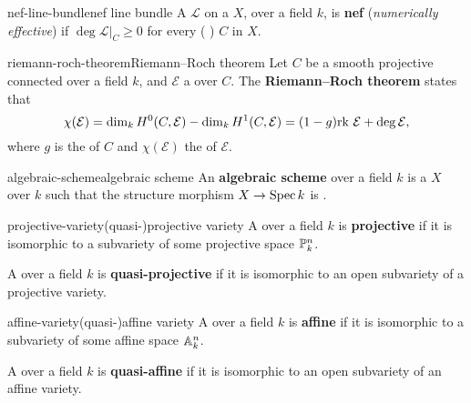 \begin{topic}{nef-line-bundle}{nef line bundle}
    A  $\mathcal{L}$ on a  $X$,  over a field $k$, is \textbf{nef} (\textit{numerically effective}) if $\deg \mathcal{L}|_C \ge 0$ for every ( )  $C$ in $X$.
\end{topic}

\begin{topic}{riemann-roch-theorem}{Riemann--Roch theorem}
    Let $C$ be a smooth projective connected  over a field $k$, and $\mathcal{E}$ a  over $C$. The \textbf{Riemann--Roch theorem} states that
    \[ \chi(\mathcal{E}) = \dim_k H^0(C, \mathcal{E}) - \dim_k H^1(C, \mathcal{E}) = (1 - g) \textup{rk } \mathcal{E} + \deg \mathcal{E} , \]
    where $g$ is the  of $C$ and $\chi(\mathcal{E})$ the  of $\mathcal{E}$.
\end{topic}

\begin{topic}{algebraic-scheme}{algebraic scheme}
    An \textbf{algebraic scheme} over a field $k$ is a  $X$ over $k$ such that the structure morphism $X \to \Spec k$ is .
\end{topic}

\begin{topic}{projective-variety}{(quasi-)projective variety}
    A  over a field $k$ is \textbf{projective} if it is isomorphic to a  subvariety of some projective space $\PP^n_k$.
    
    A  over a field $k$ is \textbf{quasi-projective} if it is isomorphic to an open subvariety of a projective variety.
\end{topic}

\begin{topic}{affine-variety}{(quasi-)affine variety}
    A  over a field $k$ is \textbf{affine} if it is isomorphic to a  subvariety of some affine space $\AA^n_k$.
    
    A  over a field $k$ is \textbf{quasi-affine} if it is isomorphic to an open subvariety of an affine variety.
\end{topic}

